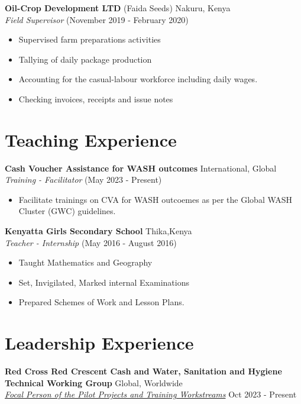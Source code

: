 \documentclass[line,margin,10pt]{res}
\begin{document}
\begin{resume}
\textbf{Oil-Crop Development LTD} (Faida Seeds) \hfill Nakuru, Kenya\\
{\sl Field Supervisor} \hfill (November 2019 - February 2020)
\begin{itemize} \itemsep -2pt
    \item Supervised farm preparations activities
    \item Tallying of daily package production
    \item Accounting for the casual-labour workforce including daily wages.
    \item Checking invoices, receipts and issue notes
\end{itemize}
{\vspace{-0.25cm}}

\section{Teaching Experience}
\textbf{Cash Voucher Assistance for WASH outcomes} \hfill International, Global\\
{\sl Training - Facilitator} \hfill (May 2023 - Present)
\begin{itemize} \itemsep -2pt
    \item Facilitate trainings on CVA for WASH outcoemes as per the Global WASH Cluster (GWC) guidelines.
\end{itemize}

\textbf{Kenyatta Girls Secondary School} \hfill Thika,Kenya\\
{\sl Teacher - Internship} \hfill (May 2016 - August 2016)
\begin{itemize} \itemsep -2pt
    \item Taught Mathematics and Geography
    \item Set, Invigilated, Marked internal Examinations
    \item Prepared Schemes of Work and Lesson Plans.
\end{itemize}

{\vspace{-0.25cm}}

\section{Leadership Experience}
\textbf{Red Cross Red Crescent Cash and Water, Sanitation and Hygiene Technical Working Group} \hfill Global, Worldwide\\
{\sl \href{https://sites.google.com/view/twgcashandwash/about-twg/membership#h.2r4pyiwuqh4k}{Focal Person of the Pilot Projects and Training Workstreams}} \hfill Oct 2023 - Present \\


\end{resume}
\end{document}
